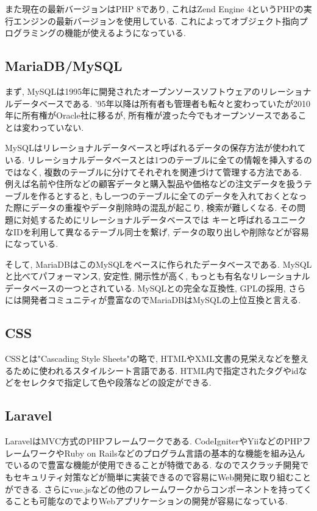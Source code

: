 \documentclass[submit,techrep]{ipsj}
\begin{document}
また現在の最新バージョンはPHP 8であり, これはZend Engine 4というPHPの実行エンジンの最新バージョンを使用している. これによってオブジェクト指向プログラミングの機能が使えるようになっている. 

\subsection{MariaDB/MySQL}
まず, MySQLは1995年に開発されたオープンソースソフトウェアのリレーショナルデータベースである. 
'95年以降は所有者も管理者も転々と変わっていたが2010年に所有権がOracle社に移るが, 所有権が渡った今でもオープンソースであることは変わっていない.

MySQLはリレーショナルデータベースと呼ばれるデータの保存方法が使われている. リレーショナルデータベースとは1つのテーブルに全ての情報を挿入するのではなく, 複数のテーブルに分けてそれぞれを関連づけて管理する方法である. 
例えば名前や住所などの顧客データと購入製品や価格などの注文データを扱うテーブルを作るとすると, もし一つのテーブルに全てのデータを入れておくとなった際にデータの重複やデータ削除時の混乱が起こり, 検索が難しくなる. その問題に対処するためにリレーショナルデータベースでは
キーと呼ばれるユニークなIDを利用して異なるテーブル同士を繋げ, データの取り出しや削除などが容易になっている. 

そして, MariaDBはこのMySQLをベースに作られたデータベースである. MySQLと比べてパフォーマンス, 安定性, 開示性が高く, もっとも有名なリレーショナルデータベースの一つとされている. MySQLとの完全な互換性, GPLの採用, さらには開発者コミュニティが豊富なのでMariaDBはMySQLの上位互換と言える. 
\subsection{CSS}
CSSとは"Cascading Style Sheets"の略で, HTMLやXML文書の見栄えなどを整えるために使われるスタイルシート言語である. 
HTML内で指定されたタグやidなどをセレクタで指定して色や段落などの設定ができる. 

\subsection{Laravel}
LaravelはMVC方式のPHPフレームワークである. CodeIgniterやYiiなどのPHPフレームワークやRuby on Railsなどのプログラム言語の基本的な機能を組み込んでいるので豊富な機能が使用できることが特徴である. 
なのでスクラッチ開発でもセキュリティ対策などが簡単に実装できるので容易にWeb開発に取り組むことができる. 
さらにvue.jsなどの他のフレームワークからコンポーネントを持ってくることも可能なのでよりWebアプリケーションの開発が容易になっている.
\end{document}
